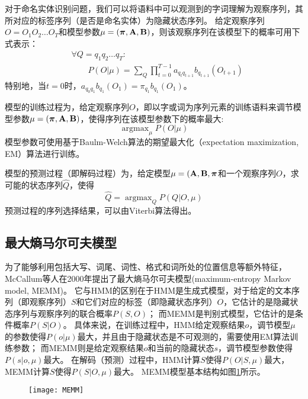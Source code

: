 对于命名实体识别问题，我们可以将语料中可以观测到的字词理解为观察序列，其所对应的标签序列（是否是命名实体）为隐藏状态序列。
给定观察序列$O = O_1 O_2\dots O_T$和模型参数$\mu = (\boldsymbol{\mathbf{\pi}},\boldsymbol{\mathbf{A}},\boldsymbol{\mathbf{B}})$，则该观察序列在该模型下的概率可用下式表示：
\begin{align}
    &\forall Q = q_1 q_2 \dots q_T:\nonumber\\
    &\qquad P(O|\mu) = \sum_Q \prod_{t=0}^{T-1}a_{q_t q_{t+1}}b_{q_{t+1}}(O_{t+1})
    \label{eq:HMM-conditional-probability}
\end{align}
特别地，当$t=0$时，$a_{q_0 q_1}b_{q_1}(O_1) = \pi_{q_1}b_{q_1}(O_1)$。

模型的训练过程为，给定观察序列$O$，即以字或词为序列元素的训练语料来调节模型参数$\mu = (\boldsymbol{\mathbf{\pi}},\boldsymbol{\mathbf{A}},\boldsymbol{\mathbf{B}})$，使得序列在该模型参数下的概率最大:
\begin{equation}
    \mathop{\arg \max}_\mu P(O|\mu)
\end{equation}
模型参数可使用基于Baulm-Welch算法的期望最大化（expectation maximization, EM）算法进行训练。

模型的预测过程（即解码过程）为，给定模型$\mu = (\boldsymbol{\mathbf{A}},\boldsymbol{\mathbf{B}},\boldsymbol{\mathbf{\pi}}$和一个观察序列$O$，求可能的状态序列$\hat{Q}$，使得
\begin{equation}
    \hat{Q} = \mathop{\arg \max}_Q P(Q|O,\mu)
\end{equation}
预测过程的序列选择结果，可以由Viterbi算法得出。

\subsection{最大熵马尔可夫模型}
为了能够利用包括大写、词尾、词性、格式和词所处的位置信息等额外特征，McCallum等人在2000年提出了最大熵马尔可夫模型(maximum-entropy Markov model, MEMM)。
它与HMM的区别在于HMM是生成式模型，对于给定的文本序列（即观察序列）$S$和它们对应的标签（即隐藏状态序列）$O$，它估计的是隐藏状态序列与观察序列的联合概率$P(S,O)$；
而MEMM是判别式模型，它估计的是条件概率$P(S|O)$。
具体来说，在训练过程中，HMM给定观察结果$o$，调节模型$\mu$的参数使得$P(o|\mu)$最大，并且由于隐藏状态是不可观测的，需要使用EM算法训练参数；
而MEMM则是给定观察结果$o$和当前的隐藏状态$s$，调节模型参数使得$P(s|o,\mu)$最大。
在解码（预测）过程中，HMM计算$S$使得$P(O|S,\mu)$最大，MEMM计算$S$使得$P(S|O,\mu)$最大。
MEMM模型基本结构如图\ref{fig:MEMM}所示。

\begin{figure}[H]
    \centering
    \texttt{[image: MEMM]}
    \label{fig:MEMM}
\end{figure}

